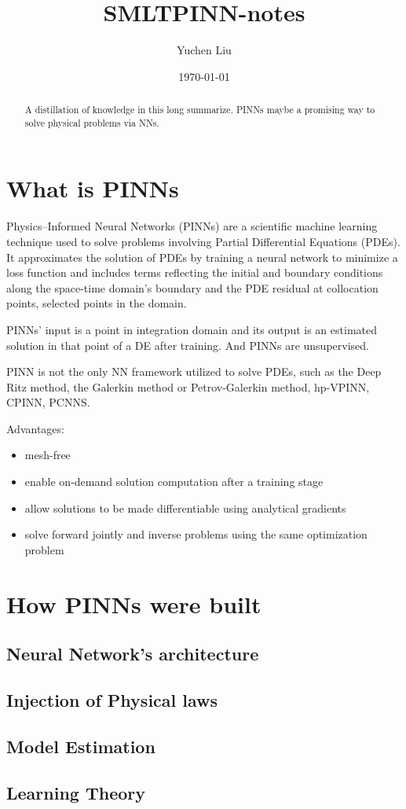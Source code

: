\documentclass{article}
\title{SMLTPINN-notes}
\author{Yuchen Liu}
\date{\today}
\begin{document}
\maketitle
\tableofcontents

\begin{abstract}
    A distillation of knowledge in this long summarize. PINNs maybe a promising way to solve physical problems via NNs.
\end{abstract}
\section{What is PINNs}
\par Physics–Informed Neural Networks (PINNs) are a scientific machine learning technique used to solve problems involving Partial Differential Equations (PDEs). It approximates the solution of PDEs by training a neural network to minimize a loss function and includes terms reflecting the initial and boundary conditions along the space-time domain's boundary and the PDE residual at collocation points, selected points in the domain.
\par PINNs' input is a point in integration domain and its output is an estimated solution in that point of a DE after training. And PINNs are unsupervised.
\par PINN is not the only NN framework utilized to solve PDEs, such as the Deep Ritz method, the Galerkin method or Petrov-Galerkin method, hp-VPINN, CPINN, PCNNS.
\par Advantages:
\begin{itemize}
    \item mesh-free
    \item enable on-demand solution computation after a training stage
    \item allow solutions to be made differentiable using analytical gradients
    \item solve forward jointly and inverse problems using the same optimization problem
\end{itemize}
\section{How PINNs were built}
\subsection{Neural Network's architecture}
\subsection{Injection of Physical laws}
\subsection{Model Estimation}
\subsection{Learning Theory}
\end{document}
